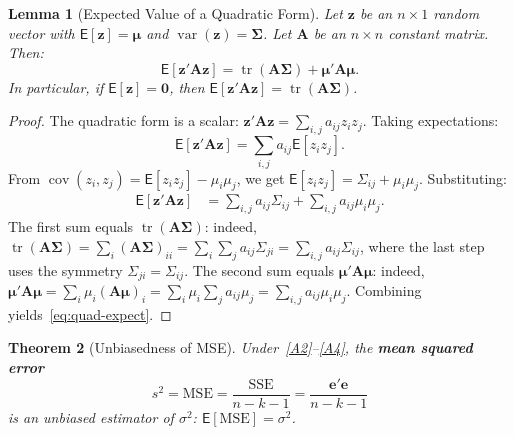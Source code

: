 \documentclass[14pt]{extarticle}
\theoremstyle{plain}
\newtheorem{theorem}{Theorem}[section]
\newtheorem{lemma}[theorem]{Lemma}
\theoremstyle{definition}
\theoremstyle{remark}
\newcommand\expc{\mathsf{E}}
\DeclareMathOperator\var{var}
\DeclareMathOperator\cov{cov}
\DeclareMathOperator\tr{tr}
\newcommand{\SSE}{\mathrm{SSE}}
\newcommand{\MSE}{\mathrm{MSE}}
\newcommand{\bzero}{\mathbf{0}}
\newcommand{\bz}{\mathbf{z}}
\newcommand{\bA}{\mathbf{A}}
\begin{document}
\begin{lemma}[Expected Value of a Quadratic Form]\label{lem:quadratic-form}
Let $\bz$ be an $n \times 1$ random vector with $\expc[\bz] = \boldsymbol\mu$ and $\var(\bz) = \boldsymbol\Sigma$. Let $\bA$ be an $n \times n$ constant matrix. Then:
\begin{equation}\label{eq:quad-expect}
\expc[\bz'\bA\bz] = \tr(\bA\boldsymbol\Sigma) + \boldsymbol\mu'\bA\boldsymbol\mu.
\end{equation}
In particular, if $\expc[\bz] = \bzero$, then $\expc[\bz'\bA\bz] = \tr(\bA\boldsymbol\Sigma)$.
\end{lemma}

\begin{proof}
The quadratic form is a scalar: $\bz'\bA\bz = \sum_{i,j} a_{ij} z_i z_j$. Taking expectations:
\[
\expc[\bz'\bA\bz] = \sum_{i,j} a_{ij} \expc[z_i z_j].
\]
From $\cov(z_i, z_j) = \expc[z_i z_j] - \mu_i\mu_j$, we get $\expc[z_i z_j] = \Sigma_{ij} + \mu_i\mu_j$. Substituting:
\begin{align*}
\expc[\bz'\bA\bz] &= \sum_{i,j} a_{ij}\Sigma_{ij} + \sum_{i,j} a_{ij}\mu_i\mu_j.
\end{align*}
The first sum equals $\tr(\bA\boldsymbol\Sigma)$: indeed, $\tr(\bA\boldsymbol\Sigma) = \sum_i (\bA\boldsymbol\Sigma)_{ii} = \sum_i \sum_j a_{ij}\Sigma_{ji} = \sum_{i,j} a_{ij}\Sigma_{ij}$, where the last step uses the symmetry $\Sigma_{ji} = \Sigma_{ij}$. The second sum equals $\boldsymbol\mu'\bA\boldsymbol\mu$: indeed, $\boldsymbol\mu'\bA\boldsymbol\mu = \sum_i \mu_i (\bA\boldsymbol\mu)_i = \sum_i \mu_i \sum_j a_{ij}\mu_j = \sum_{i,j} a_{ij}\mu_i\mu_j$. Combining yields~\eqref{eq:quad-expect}.
\end{proof}

\begin{theorem}[Unbiasedness of MSE]\label{thm:mse-unbiased}
Under~\ref{A2}--\ref{A4}, the \textbf{mean squared error}
\begin{equation}
s^2 = \MSE = \frac{\SSE}{n - k - 1} = \frac{\mathbf{e}'\mathbf{e}}{n - k - 1}
\end{equation}
is an unbiased estimator of $\sigma^2$: $\expc[\MSE] = \sigma^2$.
\end{theorem}
\end{document}
